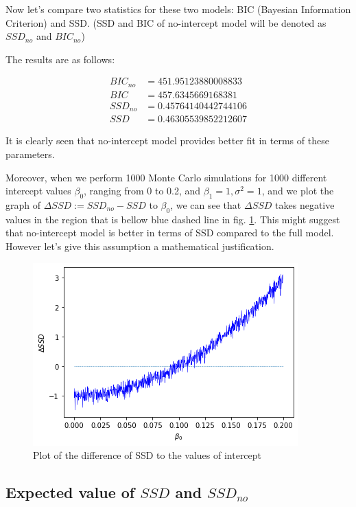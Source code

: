 \documentclass[12pt,a4paper,oneside]{book} %
\begin{document}
Now let's compare two statistics for these two models: BIC (Bayesian Information Criterion) and SSD. (SSD and BIC of no-intercept model will be denoted as $SSD_{no}$ and $BIC_{no}$)

The results are as follows:

\begin{align*}
	BIC_{no} &= 451.95123880008833 \\
	BIC &= 457.6345669168381 \\
	SSD_{no} &= 0.45764140442744106 \\
	SSD &= 0.46305539852212607	
\end{align*}


It is clearly seen that no-intercept model provides better fit in terms of these parameters.

Moreover, when we perform 1000 Monte Carlo simulations for 1000 different intercept values $\beta_0$, ranging from 0 to 0.2, and $\beta_1=1, \sigma^2=1$, and we plot the graph of $\Delta SSD := SSD_{no}-SSD$ to $\beta_0$, we can see that $\Delta SSD$ takes negative values in the region that is bellow blue dashed line in fig. \ref{fig:ssd_to_intercept}. This might suggest that no-intercept model is better in terms of SSD compared to the full model. However let's give this assumption a mathematical justification.

\begin{figure}
	\centering
	\includegraphics[width=\linewidth]{delta_ssd_to_intercept.png}
	\caption{Plot of the difference of SSD to the values of intercept}
	\label{fig:ssd_to_intercept}
\end{figure}%

\subsection{Expected value of $SSD$ and $SSD_{no}$}
\end{document}
